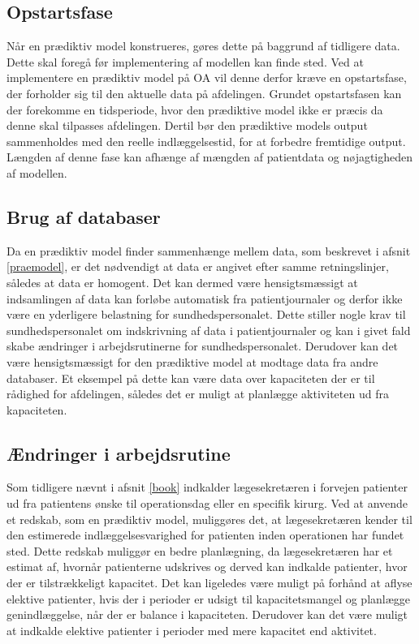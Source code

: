 \subsection{Opstartsfase}
Når en prædiktiv model konstrueres, gøres dette på baggrund af tidligere data. Dette skal foregå før implementering af modellen kan finde sted. Ved at implementere en prædiktiv model på OA vil denne derfor kræve en opstartsfase, der forholder sig til den aktuelle data på afdelingen. Grundet opstartsfasen kan der forekomme en tidsperiode, hvor den prædiktive model ikke er præcis da denne skal tilpasses afdelingen. Dertil bør den prædiktive models output sammenholdes med den reelle indlæggelsestid, for at forbedre fremtidige output. Længden af denne fase kan afhænge af mængden af patientdata og nøjagtigheden af modellen.\cite{Kuhn2013}


\subsection{Brug af databaser}
Da en prædiktiv model finder sammenhænge mellem data, som beskrevet i afsnit \ref{praemodel}, er det nødvendigt at data er angivet efter samme retningslinjer, således at data er homogent\cite{Kuhn2013}. Det  kan dermed være hensigtsmæssigt at indsamlingen af data kan forløbe automatisk fra patientjournaler og derfor ikke være en yderligere belastning for sundhedspersonalet. Dette stiller nogle krav til sundhedspersonalet om indskrivning af data i patientjournaler og kan i givet fald skabe ændringer i arbejdsrutinerne for sundhedspersonalet. Derudover kan det være hensigtsmæssigt for den prædiktive model at modtage data fra andre databaser. Et eksempel på dette kan være data over kapaciteten der er til rådighed for afdelingen, således det er muligt at planlægge aktiviteten ud fra kapaciteten.


\subsection{Ændringer i arbejdsrutine}\label{arbjedsrut}
Som tidligere nævnt i afsnit \ref{book} indkalder lægesekretæren i forvejen patienter ud fra patientens ønske til operationsdag eller en specifik kirurg. Ved at anvende et redskab, som en prædiktiv model, muliggøres det, at lægesekretæren kender til den estimerede indlæggelsesvarighed for patienten inden operationen har fundet sted. 
Dette redskab muliggør en bedre planlægning, da lægesekretæren har et estimat af, hvornår patienterne udskrives og derved kan indkalde patienter, hvor der er tilstrækkeligt kapacitet. 
Det kan ligeledes være muligt på forhånd at aflyse elektive patienter, hvis der i perioder er udsigt til kapacitetsmangel og planlægge genindlæggelse, når der er balance i kapaciteten. Derudover kan det være muligt at indkalde elektive patienter i perioder med mere kapacitet end aktivitet. 


